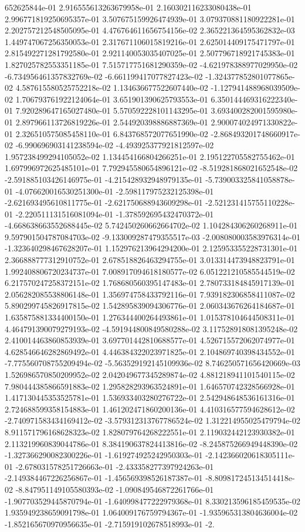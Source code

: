 652625844e-01	2.916555613263679958e-01	2.160302116233080438e-01	2.996771819250695357e-01	3.507675159926474939e-01	3.079370881180922281e-01	2.202757212548505095e-01	4.476764611656754156e-02	2.365221364595362832e-03	1.449747067256350053e-01	2.317671106015819216e-01	2.625014409175471797e-01	2.815492271281792580e-01	2.921140053035407025e-01	2.507796718921745383e-01	1.827025782553351185e-01	7.515717751681290359e-02	-4.621978388977029950e-02	-6.734956461357832769e-02	-6.661199417077827423e-02	-1.324377852801077865e-02	4.587615580525752218e-02	1.134636677522607440e-02	-1.127941488968039509e-02	1.706793761922124064e-01	3.651901390625793553e-01	6.350144469316222340e-01	7.920289647165027480e-01	5.570592228101143295e-01	3.693400282001595980e-01	2.897966113726819226e-01	2.544920398886887369e-01	2.900074024971330822e-01	2.326510575085458110e-01	6.843768572077651990e-02	-2.868493201748660917e-02	-6.990696903141238594e-02	-4.493925377921812597e-02	1.957238499294105052e-02	1.134454166804266251e-01	2.195122705582755462e-01	1.697996972625485101e-01	7.792945580654896121e-02	-8.519281868021652548e-02	-2.591885103426146975e-01	-4.215428932948979135e-01	-5.739003325841058878e-01	-4.076620016530251300e-01	-2.598117975232125398e-01	-2.621693495610811775e-01	-2.621750688943609298e-01	-2.521231415755110228e-01	-2.220511131516081094e-01	-1.378592695432470372e-01	-4.668638663552688445e-02	5.742450260662664702e-02	1.104284306260268911e-01	9.597901504787084703e-02	-9.133009287479355517e-03	-2.008080003583976314e-01	-1.323640298467628207e-01	1.152976213964294200e-01	2.125953355228731301e-01	2.366888777312910752e-01	2.678518826463294755e-01	3.013314473948823791e-01	1.992408806720234737e-01	7.008917094618180577e-02	6.051221210585544519e-02	6.217570247258372151e-02	1.768680560395147483e-01	2.780733184845917139e-01	2.056282085538806148e-01	1.356974758433792116e-01	7.939182306858411087e-02	5.890299745826917815e-02	1.542895839094306776e-01	2.060343676264184687e-01	1.635875881334400150e-01	1.276344400264493861e-01	1.015378104644508311e-01	4.464791390079279193e-02	-4.591944800849580288e-02	3.117528918081395248e-02	2.410014463860853939e-01	3.697701442810688577e-01	4.526715572062074977e-01	4.628546646282869492e-01	4.446384322023971825e-01	2.104869740398434552e-01	-7.775560708755209494e-02	-5.563529192145109936e-02	8.746250571656420669e-03	1.526986570850209952e-02	2.042049677345289874e-02	4.881218941101540115e-02	7.980444385866591883e-02	1.295828293963524891e-01	1.646570742328566928e-01	1.417130445353525781e-01	1.536933403280276722e-01	2.542948648536161316e-01	2.724688599358154883e-01	1.461202471860200136e-01	4.410316577594628612e-02	-2.740971583434169412e-02	-3.579312313767786524e-02	1.312214955025479794e-02	8.911571796168628323e-02	1.828079764268222551e-01	2.119032442123930382e-01	2.113219960839044786e-01	8.384190637824413816e-02	-8.245875266949448390e-02	-1.327366290082300226e-01	-1.619274925242950303e-01	-2.142366020618305111e-01	-2.678031578251726663e-01	-2.433358277397924263e-01	-2.149384467226256867e-01	-1.456569398526187387e-01	-8.809817245134514418e-02	-8.847951149105580393e-02	-1.090849546872261766e-01	-1.907703529445870794e-01	-1.640998477222979368e-01	8.330213596185459535e-02	1.935949238659091798e-01	1.064009176759794367e-01	-1.935965313804636004e-02	-1.852165670970956635e-01	-2.715919102678518993e-01	-2.